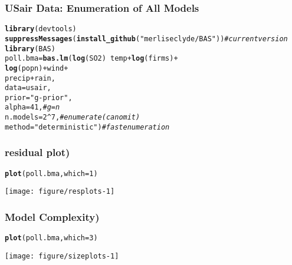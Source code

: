 \documentclass{beamer}\usepackage[]{graphicx}\usepackage[]{color}
\makeatletter
\def\maxwidth{ %
  \ifdim\Gin@nat@width>\linewidth
    \linewidth
  \else
    \Gin@nat@width
  \fi
}
\newcommand{\hlnum}[1]{\textcolor[rgb]{0.686,0.059,0.569}{#1}}%
\newcommand{\hlstr}[1]{\textcolor[rgb]{0.192,0.494,0.8}{#1}}%
\newcommand{\hlcom}[1]{\textcolor[rgb]{0.678,0.584,0.686}{\textit{#1}}}%
\newcommand{\hlopt}[1]{\textcolor[rgb]{0,0,0}{#1}}%
\newcommand{\hlstd}[1]{\textcolor[rgb]{0.345,0.345,0.345}{#1}}%
\newcommand{\hlkwb}[1]{\textcolor[rgb]{0.69,0.353,0.396}{#1}}%
\newcommand{\hlkwc}[1]{\textcolor[rgb]{0.333,0.667,0.333}{#1}}%
\newcommand{\hlkwd}[1]{\textcolor[rgb]{0.737,0.353,0.396}{\textbf{#1}}}%
\newenvironment{kframe}{%
 \def\at@end@of@kframe{}%
 \ifinner\ifhmode%
  \def\at@end@of@kframe{\end{minipage}}%
  \begin{minipage}{\columnwidth}%
 \fi\fi%
 \def\FrameCommand##1{\hskip\@totalleftmargin \hskip-\fboxsep
 \colorbox{shadecolor}{##1}\hskip-\fboxsep
     \hskip-\linewidth \hskip-\@totalleftmargin \hskip\columnwidth}%
 \MakeFramed {\advance\hsize-\width
   \@totalleftmargin\z@ \linewidth\hsize
   \@setminipage}}%
 {\par\unskip\endMakeFramed%
 \at@end@of@kframe}
\newenvironment{knitrout}{}{} %
\makeatother
\begin{document}
\begin{frame}[fragile] \frametitle{USair Data: Enumeration of All Models}
\begin{knitrout}
\color{fgcolor}\begin{kframe}
\begin{alltt}
\hlkwd{library}\hlstd{(devtools)}
\hlkwd{suppressMessages}\hlstd{(}\hlkwd{install_github}\hlstd{(}\hlstr{"merliseclyde/BAS"}\hlstd{))}  \hlcom{# current version}
\hlkwd{library}\hlstd{(BAS)}
\hlstd{poll.bma} \hlkwb{=} \hlkwd{bas.lm}\hlstd{(}\hlkwd{log}\hlstd{(SO2)} \hlopt{~} \hlstd{temp} \hlopt{+} \hlkwd{log}\hlstd{(firms)} \hlopt{+}
                             \hlkwd{log}\hlstd{(popn)} \hlopt{+} \hlstd{wind} \hlopt{+}
                             \hlstd{precip}\hlopt{+} \hlstd{rain,}
                  \hlkwc{data}\hlstd{=usair,}
                  \hlkwc{prior}\hlstd{=}\hlstr{"g-prior"}\hlstd{,}
                  \hlkwc{alpha}\hlstd{=}\hlnum{41}\hlstd{,}    \hlcom{# g = n}
                  \hlkwc{n.models}\hlstd{=}\hlnum{2}\hlopt{^}\hlnum{7}\hlstd{,}\hlcom{# enumerate (can omit)}
                  \hlkwc{method}\hlstd{=}\hlstr{"deterministic"}\hlstd{)}   \hlcom{# fast enumeration}
\end{alltt}
\end{kframe}
\end{knitrout}

\end{frame}

\begin{frame}\frametitle{residual plot)}
\begin{knitrout}
\color{fgcolor}\begin{kframe}
\begin{alltt}
\hlkwd{plot}\hlstd{(poll.bma,} \hlkwc{which}\hlstd{=}\hlnum{1}\hlstd{)}
\end{alltt}
\end{kframe}

{\centering \texttt{[image: figure/resplots-1]} 

}



\end{knitrout}
\end{frame}

\begin{frame}\frametitle{Model Complexity)}
\begin{knitrout}
\color{fgcolor}\begin{kframe}
\begin{alltt}
\hlkwd{plot}\hlstd{(poll.bma,} \hlkwc{which}\hlstd{=}\hlnum{3}\hlstd{)}
\end{alltt}
\end{kframe}

{\centering \texttt{[image: figure/sizeplots-1]} 

}



\end{knitrout}
\end{frame}
\end{document}
